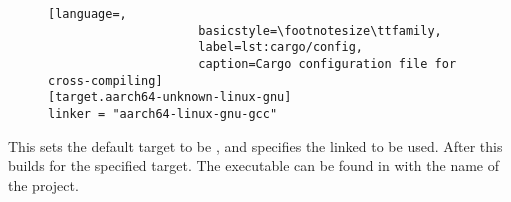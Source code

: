 \documentclass[b5paper]{report}
\begin{document}
\begin{appendices}
\begin{figure}[ht]
\begin{lstlisting}[language=,
                     basicstyle=\footnotesize\ttfamily,
                     label=lst:cargo/config,
                     caption=Cargo configuration file for cross-compiling]
[target.aarch64-unknown-linux-gnu]
linker = "aarch64-linux-gnu-gcc"
  \end{lstlisting}
  \end{figure}
  This sets the default target to be ,
  and specifies the linked to be used.
  After this  builds for the specified target.
  The executable can be found in 
  with the name of the project.




\end{appendices}



\end{document}
